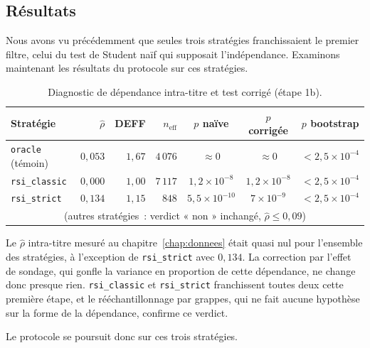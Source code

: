 \subsection{Résultats}

Nous avons vu précédemment que seules trois stratégies franchissaient le
premier filtre, celui du test de Student naïf qui supposait l'indépendance.
Examinons maintenant les résultats du protocole sur ces stratégies.

\begin{table}[H]
\centering
\caption{Diagnostic de dépendance intra-titre et test corrigé (étape 1b).}
\label{tab:b1-dep-deff}
\small
\begin{tabular}{@{}lrrrccc@{}}
\toprule
Stratégie & $\hat\rho$ & DEFF & $n_{\text{eff}}$ & $p$ naïve & $p$ corrigée & $p$ bootstrap \\
\midrule
\texttt{oracle} (témoin) & $0{,}053$ & $1{,}67$ & $4\,076$ & $\approx 0$ & $\approx 0$ & $<2{,}5\times10^{-4}$ \\
\midrule
\texttt{rsi\_classic} & $0{,}000$ & $1{,}00$ & $7\,117$ & $1{,}2\times10^{-8}$ & $1{,}2\times10^{-8}$ & $<2{,}5\times10^{-4}$ \\
\texttt{rsi\_strict}  & $0{,}134$ & $1{,}15$ & $848$    & $5{,}5\times10^{-10}$ & $7\times10^{-9}$     & $<2{,}5\times10^{-4}$ \\
\multicolumn{7}{c}{\footnotesize (autres stratégies~: verdict « non » inchangé, $\hat\rho \le 0{,}09$)} \\
\bottomrule
\end{tabular}
\end{table}
Le $\hat\rho$ intra-titre mesuré au chapitre~\ref{chap:donnees} était quasi nul
pour l'ensemble des stratégies, à l'exception de \texttt{rsi\_strict} avec
$0{,}134$. La correction par l'effet de sondage, qui gonfle la variance en
proportion de cette dépendance, ne change donc presque rien.
\texttt{rsi\_classic} et \texttt{rsi\_strict} franchissent toutes deux cette
première étape, et le rééchantillonnage par grappes, qui ne fait aucune
hypothèse sur la forme de la dépendance, confirme ce verdict.

Le protocole se poursuit donc sur ces trois stratégies.

